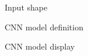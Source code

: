 \begin{frame}{Input shape}
\end{frame}

\begin{frame}{CNN model definition}
\end{frame}

\begin{frame}{CNN model display}
\end{frame}
